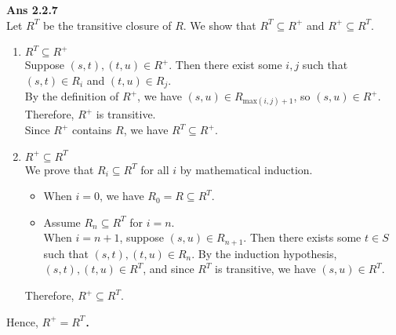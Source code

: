 \documentclass[a4paper,11pt,fleqn,dvipdfmx]{article}
\newcommand{\ansen}[1]{\noindent\textbf{Ans #1}\\[2mm]}
\newcommand{\owari}[0]{\hfill\fbox{}}
\begin{document}
    \ansen{2.2.7}
        Let $R^{T}$ be the transitive closure of $R$. We show that $R^{T} \subseteq R^{+}$ and $R^{+} \subseteq R^{T}$.
        \begin{enumerate}
            \item $R^{T} \subseteq R^{+}$ \\[2mm]
            Suppose $(s,t), (t,u) \in R^{+}$. Then there exist some $i,j$ such that $(s,t) \in R_i$ and $(t,u) \in R_j$. \\
            By the definition of $R^{+}$, we have $(s,u) \in R_{\mathrm{max}(i,j)+1}$, so $(s,u) \in R^{+}$. \\
            Therefore, $R^{+}$ is transitive. \\
            Since $R^{+}$ contains $R$, we have $R^{T} \subseteq R^{+}$.
            \item $R^{+} \subseteq R^{T}$ \\[2mm]
            We prove that $R_i \subseteq R^{T}$ for all $i$ by mathematical induction.
            \begin{itemize}
                \item When $i=0$, we have $R_0 = R \subseteq R^{T}$.
                \item Assume $R_n \subseteq R^{T}$ for $i=n$. \\
                When $i=n+1$, suppose $(s,u) \in R_{n+1}$. Then there exists some $t \in S$ such that $(s,t),(t,u) \in R_n$.
                By the induction hypothesis, $(s,t),(t,u) \in R^{T}$, and
                since $R^{T}$ is transitive, we have $(s,u) \in R^{T}$.
            \end{itemize}
            Therefore, $R^{+} \subseteq R^{T}$.
        \end{enumerate}
        Hence, $R^{+} = R^{T}$．\owari
        
    
\end{document}
